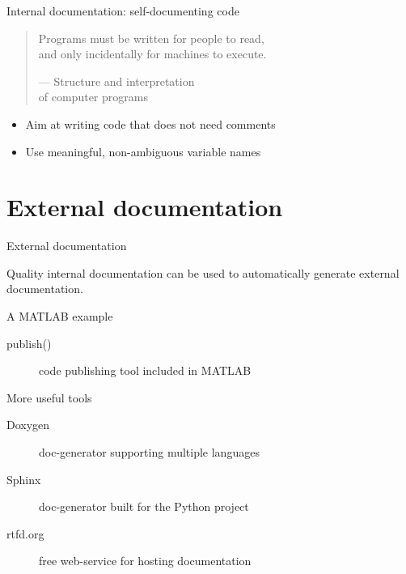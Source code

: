 \documentclass[10pt]{beamer}
\begin{document}
\begin{frame}{Internal documentation: self-documenting code} %

	\large
	\begin{quotation}
		Programs must be written for people to read, \\ and only
		incidentally for machines to execute.
		\begin{flushright}
			\small
			--- Structure and interpretation\\of computer programs
		\end{flushright}
	\end{quotation}

	\bigskip

	\begin{itemize}
		\item Aim at writing code \alert{that does not need comments}
		\item Use meaningful, \alert{non-ambiguous} variable names
	\end{itemize}

\end{frame}

\section{External documentation} %

\begin{frame}{External documentation} %

	Quality internal documentation can be used to automatically
	generate external documentation.

	\begin{block}{A MATLAB example}
		\begin{description}
			\item[publish()] code publishing tool included in MATLAB
		\end{description}
	\end{block}

	\begin{block}{More useful tools}
		\begin{description}
			\item[Doxygen] doc-generator supporting multiple languages
			\item[Sphinx] doc-generator built for the Python project
			\item[rtfd.org] free web-service for hosting documentation
		\end{description}
	\end{block}

\end{frame}
\end{document}
